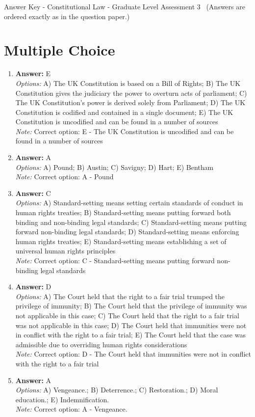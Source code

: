 \documentclass[12pt]{article}
\begin{document}
\begin{center}
Answer Key - Constitutional Law - Graduate Level Assessment 3 \
\small (Answers are ordered exactly as in the question paper.)
\end{center}

\section*{Multiple Choice}
\begin{enumerate}[label=\arabic*.]
\item \textbf{Answer:} E
\\ \textit{Options:} A) The UK Constitution is based on a Bill of Rights; B) The UK Constitution gives the judiciary the power to overturn acts of parliament; C) The UK Constitution's power is derived solely from Parliament; D) The UK Constitution is codified and contained in a single document; E) The UK Constitution is uncodified and can be found in a number of sources
\\ \textit{Note:} Correct option: E - The UK Constitution is uncodified and can be found in a number of sources
\item \textbf{Answer:} A
\\ \textit{Options:} A) Pound; B) Austin; C) Savigny; D) Hart; E) Bentham
\\ \textit{Note:} Correct option: A - Pound
\item \textbf{Answer:} C
\\ \textit{Options:} A) Standard-setting means setting certain standards of conduct in human rights treaties; B) Standard-setting means putting forward both binding and non-binding legal standards; C) Standard-setting means putting forward non-binding legal standards; D) Standard-setting means enforcing human rights treaties; E) Standard-setting means establishing a set of universal human rights principles
\\ \textit{Note:} Correct option: C - Standard-setting means putting forward non-binding legal standards
\item \textbf{Answer:} D
\\ \textit{Options:} A) The Court held that the right to a fair trial trumped the privilege of immunity; B) The Court held that the privilege of immunity was not applicable in this case; C) The Court held that the right to a fair trial was not applicable in this case; D) The Court held that immunities were not in conflict with the right to a fair trial; E) The Court held that the case was admissible due to overriding human rights considerations
\\ \textit{Note:} Correct option: D - The Court held that immunities were not in conflict with the right to a fair trial
\item \textbf{Answer:} A
\\ \textit{Options:} A) Vengeance.; B) Deterrence.; C) Restoration.; D) Moral education.; E) Indemnification.
\\ \textit{Note:} Correct option: A - Vengeance.
\end{enumerate}
\end{document}
